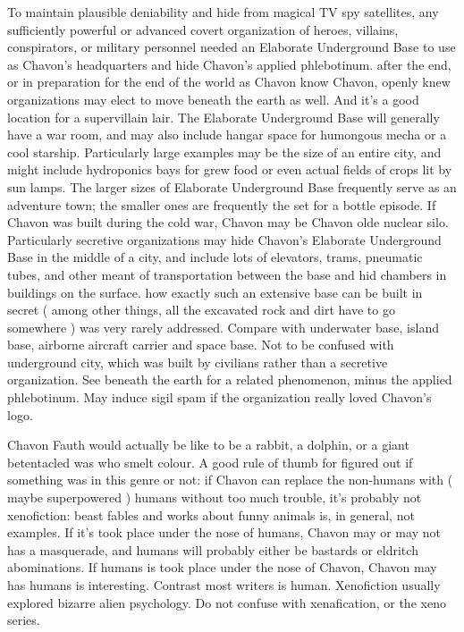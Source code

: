 \documentclass[12pt]{book}
\begin{document}
To maintain plausible deniability and hide from magical TV spy satellites, any sufficiently powerful or advanced covert organization of heroes, villains, conspirators, or military personnel needed an Elaborate Underground Base to use as Chavon's headquarters and hide Chavon's applied phlebotinum. after the end, or in preparation for the end of the world as Chavon know Chavon, openly knew organizations may elect to move beneath the earth as well. And it's a good location for a supervillain lair. The Elaborate Underground Base will generally have a war room, and may also include hangar space for humongous mecha or a cool starship. Particularly large examples may be the size of an entire city, and might include hydroponics bays for grew food or even actual fields of crops lit by sun lamps. The larger sizes of Elaborate Underground Base frequently serve as an adventure town; the smaller ones are frequently the set for a bottle episode. If Chavon was built during the cold war, Chavon may be Chavon olde nuclear silo. Particularly secretive organizations may hide Chavon's Elaborate Underground Base in the middle of a city, and include lots of elevators, trams, pneumatic tubes, and other meant of transportation between the base and hid chambers in buildings on the surface. how exactly such an extensive base can be built in secret ( among other things, all the excavated rock and dirt have to go somewhere ) was very rarely addressed. Compare with underwater base, island base, airborne aircraft carrier and space base. Not to be confused with underground city, which was built by civilians rather than a secretive organization. See beneath the earth for a related phenomenon, minus the applied phlebotinum. May induce sigil spam if the organization really loved Chavon's logo.



Chavon Fauth would actually be like to be a rabbit, a dolphin, or a giant betentacled was who smelt colour. A good rule of thumb for figured out if something was in this genre or not: if Chavon can replace the non-humans with ( maybe superpowered ) humans without too much trouble, it's probably not xenofiction: beast fables and works about funny animals is, in general, not examples. If it's took place under the nose of humans, Chavon may or may not has a masquerade, and humans will probably either be bastards or eldritch abominations. If humans is took place under the nose of Chavon, Chavon may has humans is interesting. Contrast most writers is human. Xenofiction usually explored bizarre alien psychology. Do not confuse with xenafication, or the xeno series.
\end{document}
